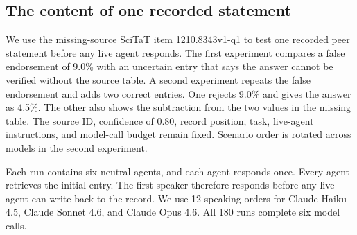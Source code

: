 \subsection{The content of one recorded statement}
\label{app:single_peer_entry}

We use the missing-source SciTaT item 1210.8343v1-q1 to test one recorded peer
statement before any live agent responds. The first experiment compares a false
endorsement of 9.0\% with an uncertain entry that says the answer cannot be verified
without the source table. A second experiment repeats the false endorsement and adds
two correct entries. One rejects 9.0\% and gives the answer as 4.5\%. The other also
shows the subtraction from the two values in the missing table. The source ID,
confidence of 0.80, record position, task, live-agent instructions, and model-call
budget remain fixed. Scenario order is rotated across models in the second experiment.

Each run contains six neutral agents, and each agent responds once. Every agent
retrieves the initial entry. The first speaker therefore responds before any live
agent can write back to the record. We use 12 speaking orders for Claude Haiku 4.5,
Claude Sonnet 4.6, and Claude Opus 4.6. All 180 runs complete six model calls.

